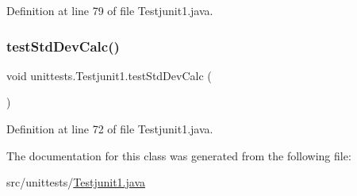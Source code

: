 Definition at line 79 of file Testjunit1.\+java.

\hypertarget{classunittests_1_1_testjunit1_a0d8d17ba74c353e33339cd9abdb9a85b}{}\label{classunittests_1_1_testjunit1_a0d8d17ba74c353e33339cd9abdb9a85b} 
\subsubsection{\texorpdfstring{test\+Std\+Dev\+Calc()}{testStdDevCalc()}}
{\footnotesize\ttfamily void unittests.\+Testjunit1.\+test\+Std\+Dev\+Calc (\begin{DoxyParamCaption}{ }\end{DoxyParamCaption})}



Definition at line 72 of file Testjunit1.\+java.



The documentation for this class was generated from the following file\+:\begin{DoxyCompactItemize}
\item 
src/unittests/\hyperlink{_testjunit1_8java}{Testjunit1.\+java}\end{DoxyCompactItemize}
